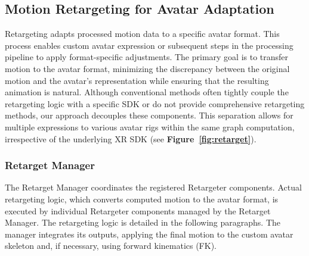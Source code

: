 \subsection{Motion Retargeting for Avatar Adaptation}
\label{sec:retargeter}

Retargeting adapts processed motion data to a specific avatar format.
This process enables custom avatar expression or subsequent steps in the processing pipeline to apply format-specific adjustments.
The primary goal is to transfer motion to the avatar format, minimizing the discrepancy between the original motion and the avatar's representation while ensuring that the resulting animation is natural.
Although conventional methods often tightly couple the retargeting logic with a specific SDK or do not provide comprehensive retargeting methods, our approach decouples these components.
This separation allows for multiple expressions to various avatar rigs within the same graph computation, irrespective of the underlying XR SDK (see {\bf Figure~\ref{fig:retarget}}).

\subsubsection{Retarget Manager}
The Retarget Manager coordinates the registered Retargeter components.
Actual retargeting logic, which converts computed motion to the avatar format, is executed by individual Retargeter components managed by the Retarget Manager.
The retargeting logic is detailed in the following paragraphs.
The manager integrates its outputs, applying the final motion to the custom avatar skeleton and, if necessary, using forward kinematics (FK).

